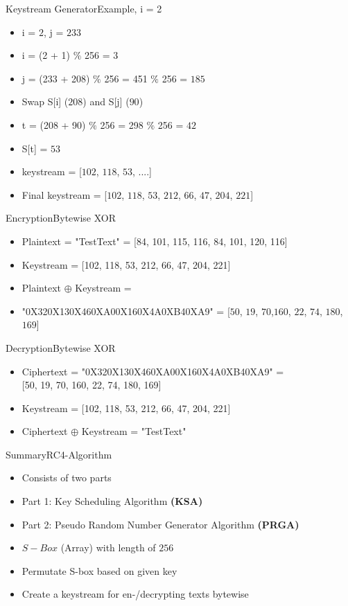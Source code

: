\documentclass[
	aspectratio=169,	%
	onlytextwidth,		%
	t					%
	]{beamer}
\begin{document}
\begin{frame}[fragile]{Keystream Generator}{Example, i = 2}
	\begin{itemize}
		\item i = $2$, j = $233$
		\item i = (2 + 1) $\%$ 256 = $3$
		\item j = (233 + 208) $\%$ 256 = 451 $\%$ 256 = $185$
		\item Swap S[i] ($208$) and S[j] ($90$)
		\item t = (208 + 90) $\%$ 256 = 298 $\%$ 256 = $42$
		\item S[t] = $53$
		\item keystream = [$102$, $118$, $53$, ....]
		\item Final keystream = [$102$, $118$, $53$, $212$, $66$, $47$, $204$, $221$]
	\end{itemize}
\end{frame}

\begin{frame}[fragile]{Encryption}{Bytewise XOR}
	\small
	\begin{itemize}
		\item Plaintext = "TestText" = {\color{purple}[84, 101, 115, 116, 84, 101, 120, 116]}
		\item Keystream = {\color{olive}[102, 118, 53, 212, 66, 47, 204, 221]}
		\item Plaintext $\oplus$ Keystream =
		\item "0X320X130X460XA00X160X4A0XB40XA9" = [$50$, $19$, $70$,$160$, $22$, $74$, $180$, $169$]
	\end{itemize}
	\normalsize
\end{frame}

\begin{frame}[fragile]{Decryption}{Bytewise XOR}
	\small
	\begin{itemize}
		\item Ciphertext = "0X320X130X460XA00X160X4A0XB40XA9" = \\{\color{purple}[50, 19, 70, 160, 22, 74, 180, 169]}
		\item Keystream = {\color{olive}[102, 118, 53, 212, 66, 47, 204, 221]} 
		\item Ciphertext $\oplus$ Keystream = "TestText"
	\end{itemize}
	\normalsize
\end{frame}

\begin{frame}[fragile]{Summary}{RC4-Algorithm}
	\begin{itemize}
		\item Consists of two parts
		\item Part 1: Key Scheduling Algorithm \textbf{(KSA)}
		\item Part 2: Pseudo Random Number Generator Algorithm \textbf{(PRGA)}
		\item $S-Box$ (Array) with length of $256$
		\item Permutate S-box based on given key
		\item Create a keystream for en-/decrypting texts bytewise
	\end{itemize}
\end{frame}
\end{document}
